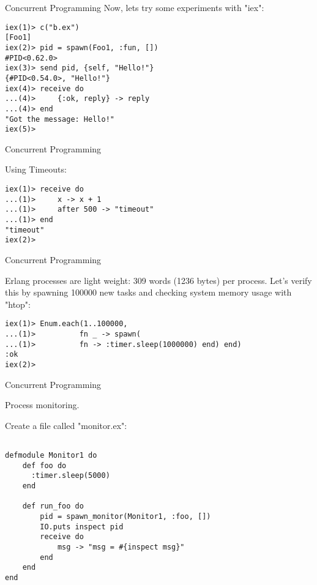 \documentclass{beamer}
\begin{document}
\begin{frame}[fragile]{Concurrent Programming}
Now, lets try some experiments with "iex":

\begin{verbatim}
iex(1)> c("b.ex")
[Foo1]
iex(2)> pid = spawn(Foo1, :fun, [])
#PID<0.62.0>
iex(3)> send pid, {self, "Hello!"}
{#PID<0.54.0>, "Hello!"}
iex(4)> receive do
...(4)>     {:ok, reply} -> reply
...(4)> end
"Got the message: Hello!"
iex(5)>
\end{verbatim}

\end{frame}

\begin{frame}[fragile]{Concurrent Programming}

Using Timeouts:

\begin{verbatim}
iex(1)> receive do
...(1)>     x -> x + 1
...(1)>     after 500 -> "timeout"
...(1)> end
"timeout"
iex(2)>
\end{verbatim}

\end{frame}

\begin{frame}[fragile]{Concurrent Programming}

Erlang processes are light weight: 309 words (1236 bytes)
per process. Let's verify this by spawning 100000 new tasks
and checking system memory usage with "htop":

\begin{verbatim}
iex(1)> Enum.each(1..100000, 
...(1)>          fn _ -> spawn(
...(1)>          fn -> :timer.sleep(1000000) end) end)
:ok
iex(2)>
\end{verbatim}

\end{frame}

\begin{frame}[fragile]{Concurrent Programming}

Process monitoring.

Create a file called "monitor.ex":

\begin{verbatim}

defmodule Monitor1 do
    def foo do
      :timer.sleep(5000)
    end
    
    def run_foo do
        pid = spawn_monitor(Monitor1, :foo, [])
        IO.puts inspect pid
        receive do
            msg -> "msg = #{inspect msg}"
        end
    end
end
\end{verbatim}

\end{frame}
\end{document}
